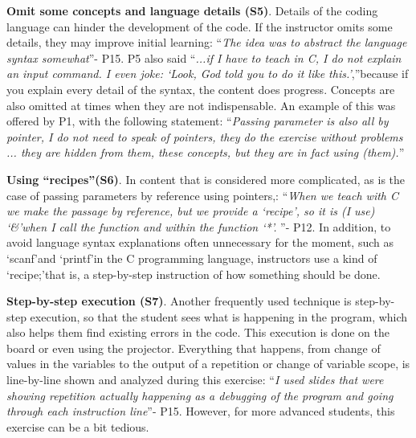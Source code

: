 \documentclass[sigconf]{acmart}
\begin{document}
\textbf{Omit some concepts and language details (S5)}. Details of the coding language can hinder the development of the code. If the instructor omits some details, they may improve initial learning: \textquotedblleft \textit{The idea was to abstract the language syntax somewhat}\textquotedblright \space - P15. P5 also said \textquotedblleft \textit{...if I have to teach in C, I do not explain an input command. I even joke: \textquoteleft{Look, God told you to do it like this.}\textquoteright},\textquotedblright \space because if you explain every detail of the syntax, the content does progress. Concepts are also omitted at times when they are not indispensable. An example of this was offered by P1, with the following statement:  \textquotedblleft \textit{Passing parameter is also all by pointer, I do not need to speak of pointers, they do the exercise without problems ... they are hidden from them, these concepts, but they are in fact using (them).}\textquotedblright

\textbf{Using \textquotedblleft{recipes}\textquotedblright \space (S6)}. In content that is considered more complicated, as is the case of passing parameters by reference using pointers,: \textquotedblleft \textit{When we teach with C we make the passage by reference, but we provide a \textquoteleft{recipe}\textquoteright, so it is (I use) \textquoteleft{\&}\textquoteright \space when I call the function and within the function \textquoteleft{*}\textquoteright . }\textquotedblright \space - P12. In addition, to avoid language syntax explanations often unnecessary for the moment, such as \textquoteleft{scanf}\textquoteright \space and \textquoteleft{printf}\textquoteright \space in the C programming language, instructors use a kind of \textquoteleft{recipe;}\textquoteright \space that is, a step-by-step instruction of how something should be done.

\textbf{Step-by-step execution (S7)}. Another frequently used technique is step-by-step execution, so that the student sees what is happening in the program, which also helps them find existing errors in the code. This execution is done on the board or even using the projector. Everything that happens, from change of values in the variables to the output of a repetition or change of variable scope, is line-by-line shown and analyzed during this exercise: \textquotedblleft \textit{I used slides that were showing repetition actually happening as a debugging of the program and going through each instruction line}\textquotedblright \space - P15. However, for more advanced students, this exercise can be a bit tedious.
\end{document}

